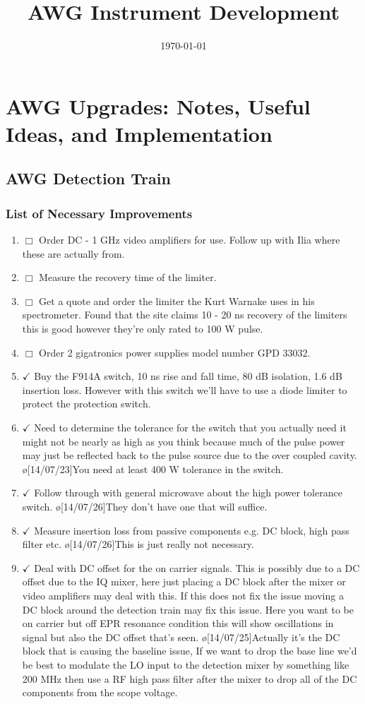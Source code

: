 \documentclass[10pt]{book}
\title{AWG Instrument Development}
\date{\today}
\begin{document}
\maketitle

\chapter{AWG Upgrades: Notes, Useful Ideas, and Implementation}
\section{AWG Detection Train}
\subsection{List of Necessary Improvements}
\begin{enumerate}
    \item $\Box$ Order DC - 1 GHz video amplifiers for use. Follow up with Ilia where these are actually from. 
    \item $\Box$ Measure the recovery time of the limiter.
    \item $\Box$ Get a quote and order the limiter the Kurt Warnake uses in his spectrometer. Found that the site claims 10 - 20 ns recovery of the limiters this is good however they're only rated to 100 W pulse.
    \item $\Box$ Order 2 gigatronics power supplies model number GPD 33032.
	\item $\checkmark$ Buy the F914A switch, 10 ns rise and fall time, 80 dB isolation, 1.6 dB insertion loss. However with this switch we'll have to use a diode limiter to protect the protection switch. 
    \item $\checkmark$ Need to determine the tolerance for the switch that you actually need it might not be nearly as high as you think because much of the pulse power may just be reflected back to the pulse source due to the over coupled cavity. \o[14/07/23]{You need at least 400 W tolerance in the switch.}
    \item $\checkmark$ Follow through with general microwave about the high power tolerance switch. \o[14/07/26]{They don't have one that will suffice.}
    \item $\checkmark$ Measure insertion loss from passive components e.g. DC block, high pass filter etc. \o[14/07/26]{This is just really not necessary.}
    \item $\checkmark$ Deal with DC offset for the on carrier signals. This is possibly due to a DC offset due to the IQ mixer, here just placing a DC block after the mixer or video amplifiers may deal with this. If this does not fix the issue moving a DC block around the detection train may fix this issue. Here you want to be on carrier but off EPR resonance condition this will show oscillations in signal but also the DC offset that's seen.  \o[14/07/25]{Actually it's the DC block that is causing the baseline issue, If we want to drop the base line we'd be best to modulate the LO input to the detection mixer by something like 200 MHz then use a RF high pass filter after the mixer to drop all of the DC components from the scope voltage.}

\end{enumerate}
\end{document}
